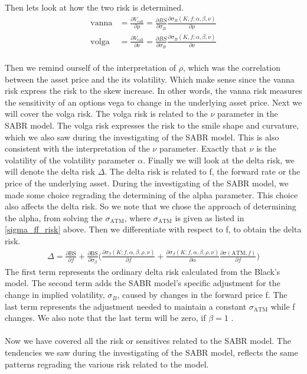 \\\\
Then lets look at how the two risk is determined. 
\begin{align*}
    \text{vanna} &= \frac{\partial V_{\text{call}}}{\partial \rho} = \frac{\partial BS}{\partial \sigma_B} \frac{\partial \sigma_B(K, f; \alpha, \beta, \nu)}{\partial \rho} \\
    \text{volga} &= \frac{\partial V_{\text{call}}}{\partial \nu} = \frac{\partial BS}{\partial \sigma_B} \frac{\partial \sigma_B(K, f; \alpha, \beta, \nu)}{\partial \nu}
\end{align*}
\\
Then we remind ourself of the interpretation of $\rho$,
which was the correlation between the asset price and the its 
volatility. Which make sense since the vanna risk express
the risk to the skew increase. In other words, the vanna risk 
measures the sensitivity of an options vega to change in 
the underlying asset price. Next we will cover the volga risk.
The volga risk is related to the $\nu$ parameter in the SABR model. 
The volga risk expresses the risk to the smile shape and curvature,
which we also saw during the investigating of the SABR model. 
This is also consistent with the interpretation of the $\nu$ parameter. 
Exactly that $\nu$ is the volatility of the volatility parameter $\alpha$.
\newpage
\noindent
Finally we will look at the delta risk, we will denote
the delta risk $\Delta$. The delta risk is related to f, the 
forward rate or the price of the underlying asset. 
During the investigating of the SABR model, we made
some choice regrading the determining of the alpha parameter.
This choice also affects the delta risk. So we note that
we chose the approach of determining the alpha, from solving the
$\sigma_{\text{ATM}}$, where $\sigma_{\text{ATM}}$ is given as 
listed in \autoref{sigma_ff_risk} above. 
Then we differentiate with respect to f, to obtain the delta risk. 
\begin{align}
    \Delta = \frac{\partial \text{BS}}{\partial f} +
     \frac{\partial \text{BS}}{\partial \sigma_\beta} 
     \Big({\frac{\partial \sigma_\beta(K; f, \alpha, \beta, \rho, \nu)}
     {\partial f}  + \frac{\partial \sigma_\beta(K; f, \alpha, \beta,
     \rho, \nu)}{\partial \alpha} 
     \frac{\partial \sigma(\text{ATM}, f)}{\partial f}}\Big)
\end{align}
The first term represents the ordinary delta risk calculated from 
the Black's model. The second term adds the SABR model's
 specific adjustment for the change in implied volatility, 
$\sigma_B$, caused by changes in the forward price f.
The last term represents the adjustment needed to maintain a constant 
$\sigma_{\text{ATM}}$ while f changes.
We also note that the last term will be zero, if $\beta=1$ \cite{Smile}.
\\\\
Now we have covered all the risk or sensitives related to the SABR model. 
The tendencies we saw during the investigating of the SABR model, reflects
the same patterns regrading the various risk related to the model. 